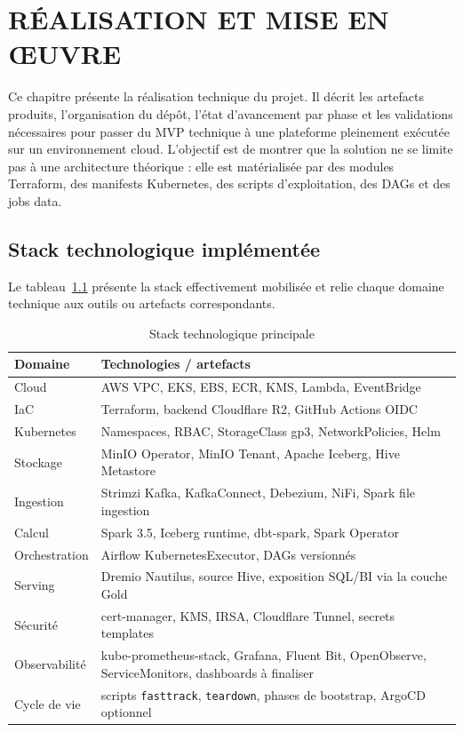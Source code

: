 \chapter{RÉALISATION ET MISE EN ŒUVRE}
\label{ch:realisation}

Ce chapitre présente la réalisation technique du projet. Il décrit les artefacts produits, l'organisation du dépôt, l'état d'avancement par phase et les validations nécessaires pour passer du MVP technique à une plateforme pleinement exécutée sur un environnement cloud. L'objectif est de montrer que la solution ne se limite pas à une architecture théorique : elle est matérialisée par des modules Terraform, des manifests Kubernetes, des scripts d'exploitation, des DAGs et des jobs data.

\section{Stack technologique implémentée}

Le tableau~\ref{tab:stack} présente la stack effectivement mobilisée et relie chaque domaine technique aux outils ou artefacts correspondants.

\begin{table}[H]
\centering
\caption{Stack technologique principale}
\label{tab:stack}
\small
\begin{tabular}{@{}p{}p{}@{}}
\toprule
\textbf{Domaine} & \textbf{Technologies / artefacts} \\
\midrule
Cloud & AWS VPC, EKS, EBS, ECR, KMS, Lambda, EventBridge \\
IaC & Terraform, backend Cloudflare R2, GitHub Actions OIDC \\
Kubernetes & Namespaces, RBAC, StorageClass gp3, NetworkPolicies, Helm \\
Stockage & MinIO Operator, MinIO Tenant, Apache Iceberg, Hive Metastore \\
Ingestion & Strimzi Kafka, KafkaConnect, Debezium, NiFi, Spark file ingestion \\
Calcul & Spark 3.5, Iceberg runtime, dbt-spark, Spark Operator \\
Orchestration & Airflow KubernetesExecutor, DAGs versionnés \\
Serving & Dremio Nautilus, source Hive, exposition SQL/BI via la couche Gold \\
Sécurité & cert-manager, KMS, IRSA, Cloudflare Tunnel, secrets templates \\
Observabilité & kube-prometheus-stack, Grafana, Fluent Bit, OpenObserve, ServiceMonitors, dashboards à finaliser \\
Cycle de vie & scripts \texttt{fasttrack}, \texttt{teardown}, phases de bootstrap, ArgoCD optionnel \\
\bottomrule
\end{tabular}
\end{table}

